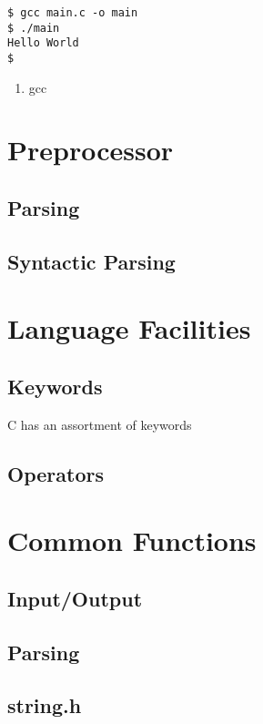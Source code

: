 \begin{verbatim}
$ gcc main.c -o main
$ ./main
Hello World
$
\end{verbatim}

\begin{enumerate}
\item gcc
\end{enumerate}

\section{Preprocessor}

\subsection{Parsing}

\subsection{Syntactic Parsing}

\section{Language Facilities}

\subsection{Keywords}

C has an assortment of keywords

\subsection{Operators}

\section{Common Functions}

\subsection{Input/Output}

\subsection{Parsing}

\subsection{string.h}

